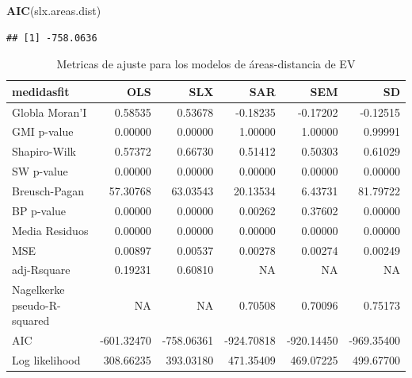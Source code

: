\documentclass[12pt,]{book}
\newenvironment{Shaded}{\begin{snugshade}}{\end{snugshade}}
\newcommand{\KeywordTok}[1]{\textcolor[rgb]{0.13,0.29,0.53}{\textbf{#1}}}
\newcommand{\NormalTok}[1]{#1}
\begin{document}
\begin{Shaded}
\begin{Highlighting}[]
\KeywordTok{AIC}\NormalTok{(slx.areas.dist)}
\end{Highlighting}
\end{Shaded}

\begin{verbatim}
## [1] -758.0636
\end{verbatim}

\begin{table}

\caption{\label{tab:tabla-comp-modelos-areasdist}Metricas de ajuste para los modelos de áreas-distancia de EV}
\centering
\begin{tabular}[t]{l|r|r|r|r|r}
\hline
medidasfit & OLS & SLX & SAR & SEM & SD\\
\hline
Globla Moran'I & 0.58535 & 0.53678 & -0.18235 & -0.17202 & -0.12515\\
\hline
GMI p-value & 0.00000 & 0.00000 & 1.00000 & 1.00000 & 0.99991\\
\hline
Shapiro-Wilk & 0.57372 & 0.66730 & 0.51412 & 0.50303 & 0.61029\\
\hline
SW p-value & 0.00000 & 0.00000 & 0.00000 & 0.00000 & 0.00000\\
\hline
Breusch-Pagan & 57.30768 & 63.03543 & 20.13534 & 6.43731 & 81.79722\\
\hline
BP p-value & 0.00000 & 0.00000 & 0.00262 & 0.37602 & 0.00000\\
\hline
Media Residuos & 0.00000 & 0.00000 & 0.00000 & 0.00000 & 0.00000\\
\hline
MSE & 0.00897 & 0.00537 & 0.00278 & 0.00274 & 0.00249\\
\hline
adj-Rsquare & 0.19231 & 0.60810 & NA & NA & NA\\
\hline
Nagelkerke pseudo-R-squared & NA & NA & 0.70508 & 0.70096 & 0.75173\\
\hline
AIC & -601.32470 & -758.06361 & -924.70818 & -920.14450 & -969.35400\\
\hline
Log likelihood & 308.66235 & 393.03180 & 471.35409 & 469.07225 & 499.67700\\
\hline
\end{tabular}
\end{table}
\end{document}
